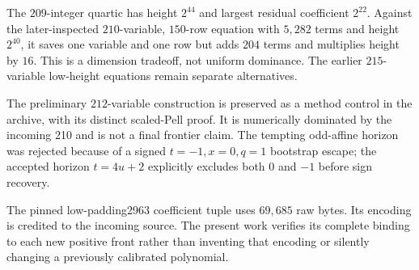 The $209$-integer quartic has height $2^{44}$ and largest residual
coefficient $2^{22}$. Against the later-inspected $210$-variable,
$150$-row equation with $5{,}282$ terms and height $2^{40}$, it saves one
variable and one row but adds $204$ terms and multiplies height by $16$.
This is a dimension tradeoff, not uniform dominance. The earlier
$215$-variable low-height equations remain separate alternatives.

The preliminary $212$-variable construction is preserved as a method
control in the archive, with its distinct scaled-Pell proof. It is
numerically dominated by the incoming 210 and is not a final frontier claim.
The tempting odd-affine horizon was rejected because of a signed
$t=-1,x=0,q=1$ bootstrap escape; the accepted horizon $t=4u+2$ explicitly
excludes both $0$ and $-1$ before sign recovery.

The pinned low-padding2963 coefficient tuple uses $69{,}685$ raw bytes.
Its encoding is credited to the incoming source. The present work verifies
its complete binding to each new positive front rather than inventing that
encoding or silently changing a previously calibrated polynomial.
